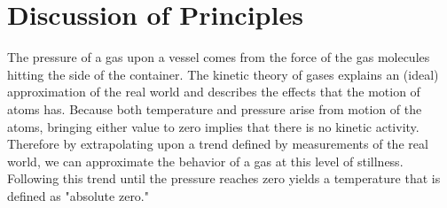 \documentclass[11pt,letterpaper]{report}
\begin{document}
\section*{Discussion of Principles}
The pressure of a gas upon a vessel comes from the force of the gas molecules hitting the side of the container. The kinetic theory of gases explains an (ideal) approximation of the real world and describes the effects that the motion of atoms has. Because both temperature and pressure arise from motion of the atoms, bringing either value to zero implies that there is no kinetic activity. Therefore by extrapolating upon a trend defined by measurements of the real world, we can approximate the behavior of a gas at this level of stillness. Following this trend until the pressure reaches zero yields a temperature that is defined as "absolute zero."
\end{document}
